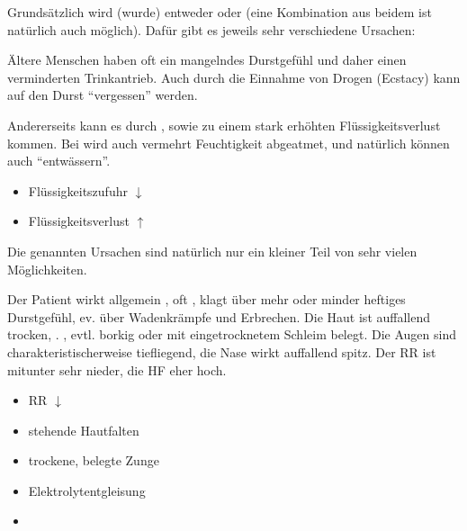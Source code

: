 {


Grundsätzlich wird (wurde) entweder  oder  (eine Kombination aus beidem ist natürlich auch
möglich). Dafür gibt es jeweils sehr verschiedene Ursachen:

{%
Ältere Menschen haben oft ein mangelndes Durstgefühl und daher
einen verminderten Trinkantrieb. Auch durch die Einnahme von
Drogen (Ecstacy) kann auf den Durst \enquote{vergessen} werden.  

Andererseits kann es durch , 
sowie  zu einem stark erhöhten
Flüssigkeitsverlust kommen. Bei  wird auch
vermehrt Feuchtigkeit abgeatmet, und natürlich können
auch  \enquote{entwässern}.
}{
\begin{itemize} %
  \item Flüssigkeitszufuhr ${\downarrow}$
  \item Flüssigkeitsverlust ${\uparrow}$
\end{itemize}
}{}{}{}

Die genannten Ursachen sind natürlich nur ein kleiner Teil
von sehr vielen Möglichkeiten.

{%
Der Patient wirkt allgemein , oft
, klagt über mehr oder minder heftiges
Durstgefühl, ev. über Wadenkrämpfe und Erbrechen. Die Haut
ist auffallend trocken, . , evtl.
borkig oder mit eingetrocknetem Schleim belegt. Die Augen
sind charakteristischerweise tiefliegend, die Nase wirkt
auffallend spitz. Der RR ist mitunter sehr nieder, die HF
eher hoch. 
}{
\begin{itemize}
    \item RR ${\downarrow}$
    \item stehende Hautfalten
    \item trockene, belegte Zunge
    \item Elektrolytentgleisung
    \item {}
\end{itemize}
}{}{}{}




}
